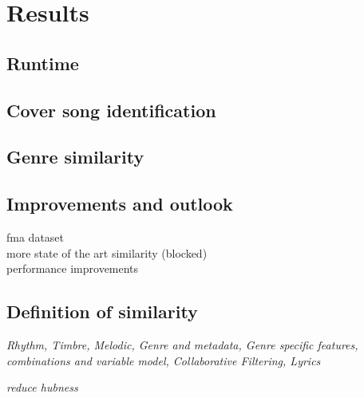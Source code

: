 
\chapter{Results}\label{bds2}

\section{Runtime}

\section{Cover song identification}

\section{Genre similarity}

\section{Improvements and outlook}

fma dataset\\
more state of the art similarity (blocked)\\
performance improvements\\

\section{Definition of similarity}
\textit{Rhythm, Timbre, Melodic, Genre and metadata, Genre specific features, combinations and variable model, Collaborative Filtering, Lyrics}

\textit{reduce hubness}

